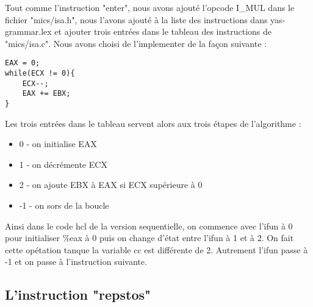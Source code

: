 \documentclass[12pt]{article}
\begin{document}
Tout comme l'instruction "enter", nous avons ajouté l'opcode I\_MUL dans le fichier "mics/isa.h", nous l'avons ajouté à la liste des instructions dans yas-grammar.lex et ajouter trois entrées dans le tableau des instructions de "mics/isa.c". Nous avons choisi de l'implementer de la façon suivante : 
\begin{verbatim}
EAX = 0;
while(ECX != 0){
    ECX--;
    EAX += EBX;
}
\end{verbatim}

Les trois entrées dans le tableau servent alors aux trois étapes de l'algorithme :

\begin{itemize}
	\item 0 - on initialise EAX
	\item 1 - on décrémente ECX
	\item 2 - on ajoute EBX à EAX si ECX supérieure à 0
	\item -1 - on sors de la boucle
\end{itemize}

Ainsi dans le code hcl de la version sequentielle, on commence avec l'ifun à 0 
pour initialiser \%eax à 0 puis on change d'état entre l'ifun à 1 et à 2. On fait cette opétation tanque la variable cc est différente de 2.
Autrement l'ifun passe à -1 et on passe à l'instruction suivante.

\subsection{L'instruction "repstos"}
\end{document}
